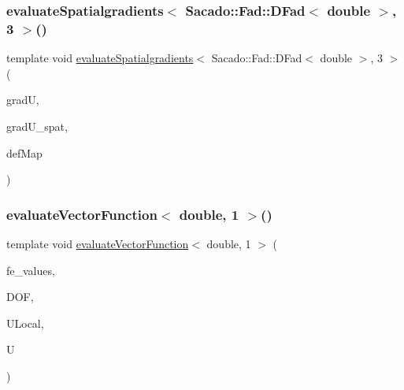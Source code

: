 \subsubsection{\texorpdfstring{evaluate\+Spatialgradients$<$ Sacado\+::\+Fad\+::\+D\+Fad$<$ double $>$, 3 $>$()}{evaluateSpatialgradients< Sacado::Fad::DFad< double >, 3 >()}\hspace{0.1cm}{\footnotesize\ttfamily [2/2]}}
{\footnotesize\ttfamily template void \mbox{\hyperlink{group___evaluation_functions_ga0b976342d491f6215953e2e65ea6a0de}{evaluate\+Spatialgradients}}$<$ Sacado\+::\+Fad\+::\+D\+Fad$<$ double $>$, 3 $>$ (\begin{DoxyParamCaption}\item[{Table$<$ 3, Sacado\+::\+Fad\+::\+D\+Fad$<$ double $>$$>$ \&}]{gradU,  }\item[{Table$<$ 3, Sacado\+::\+Fad\+::\+D\+Fad$<$ double $>$$>$}]{grad\+U\+\_\+spat,  }\item[{\mbox{\hyperlink{structdeformation_map}{deformation\+Map}}$<$ Sacado\+::\+Fad\+::\+D\+Fad$<$ double $>$, 3 $>$ \&}]{def\+Map }\end{DoxyParamCaption})}

\mbox{\label{function_evaluations_8cc_adab42860d3e6d233bc937b4574606f60}} 
\subsubsection{\texorpdfstring{evaluate\+Vector\+Function$<$ double, 1 $>$()}{evaluateVectorFunction< double, 1 >()}}
{\footnotesize\ttfamily template void \mbox{\hyperlink{group___evaluation_functions_gab9e164be1be244df81c932426a4bd513}{evaluate\+Vector\+Function}}$<$ double, 1 $>$ (\begin{DoxyParamCaption}\item[{const F\+E\+Values$<$ 1 $>$ \&}]{fe\+\_\+values,  }\item[{unsigned int}]{D\+OF,  }\item[{Table$<$ 1, double $>$ \&}]{U\+Local,  }\item[{Table$<$ 2, double $>$ \&}]{U }\end{DoxyParamCaption})}

\mbox{\label{function_evaluations_8cc_a418401c6810307bd7073ff5f72b3bd77}} 
